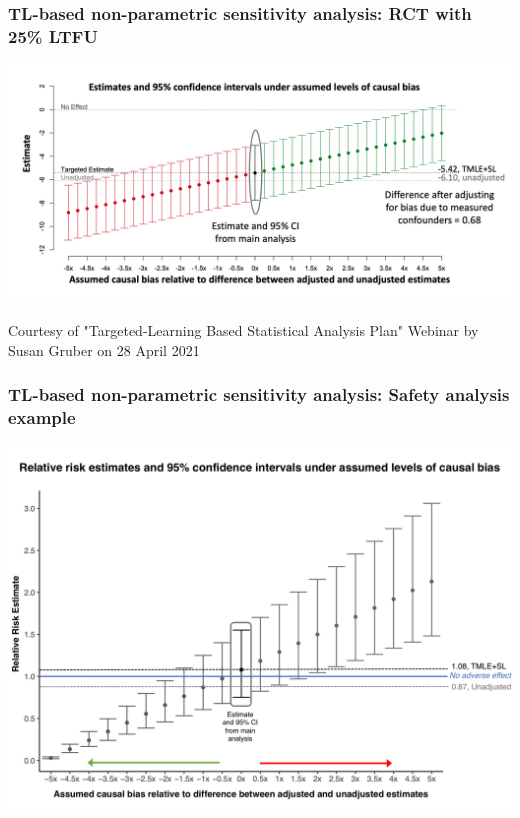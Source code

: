 \documentclass[t]{beamer}
\begin{document}
\begin{frame}
\frametitle{TL-based non-parametric sensitivity analysis: RCT with 25\% LTFU}
\vspace{-10pt}
  \begin{center}
  \includegraphics[width = 1.05\textwidth]{figures/gruber_sensitivity.png}
  \end{center}
  \vspace{35pt}
\tiny{Courtesy of "Targeted-Learning Based Statistical Analysis Plan" Webinar by Susan Gruber on 28 April 2021}
\end{frame}

\begin{frame}
\frametitle{TL-based non-parametric sensitivity analysis: Safety analysis example}

\vspace{-18pt}
  \begin{center}
  \includegraphics[width = 1.01\textwidth]{figures/sensitivityRR_greyscale.pdf}
  \end{center}
\end{frame}
\end{document}
